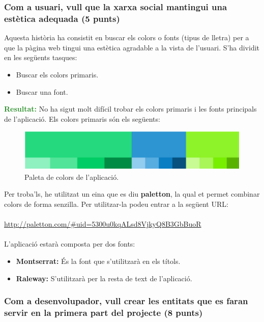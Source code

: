 \documentclass[11pt,catalan,listoffigures,listoftables]{tfgetsinf}
\begin{document}
\subsubsection{Com a usuari, vull que la xarxa social mantingui una estètica adequada (5 punts)}

Aquesta història  ha consistit en buscar els colors o fonts (tipus de lletra) per a que la pàgina web tingui una estètica agradable a la vista de l’usuari. S’ha dividit en les següents tasques:
\begin{itemize}
	\item Buscar els colors primaris.
	\item Buscar una font.
\end{itemize}
\textcolor{forestgreen}{\textbf{Resultat:}} No ha sigut molt difícil trobar els colors primaris i les fonts principals de l’aplicació. Els colors primaris són els següents:

\begin{figure}[h]
\includegraphics[width=12cm]{images/image1}
\centering
\caption[]{Paleta de colors de l'aplicació.}
\centering
\end{figure}

Per troba’ls, he utilitzat un eina que es diu \textbf{paletton}, la qual et permet combinar colors de forma senzilla. Per utilitzar-la podeu entrar a la següent URL: \\ \\
\url{http://paletton.com/\#uid=5300u0kqALsd8VjkyQ8B3GbBuoR} \\ \\
L’aplicació estarà composta per dos fonts:
\begin{itemize}
	\item \textbf{Montserrat:} És la font que s’utilitzarà en els títols.
	\item \textbf{Raleway:} S’utilitzarà per la resta de text de l’aplicació.
\end{itemize}

\subsubsection{Com a desenvolupador, vull crear les entitats que es faran servir en la primera part del projecte (8 punts)}
\end{document}
